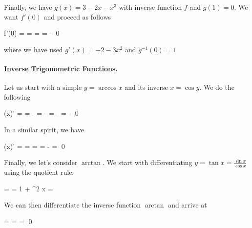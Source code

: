Finally, we have $g(x) = 3-2x-x^3$ with inverse function $f$ and $g(1) = 0$. We want $f'(0)$ and proceed as follows

\bee
f'(0) =  =  =  = -  \qed
\eee

where we have used $g'(x) = -2 - 3x^2$ and $g^{-1}(0) = 1$

\paragraph{Inverse Trigonometric Functions.} Let us start with a simple $y = \arccos x$ and its inverse $x = \cos y$. We do the following

\bee
(\arccos x)' =  = -  = -  = -  = -  \qed
\eee

In a similar spirit, we have

\bee
(\arcsin x)' =  =  =  = -  =  \qed
\eee

Finally, we let's consider $\arctan$. We start with differentiating $y = \tan x = \frac{\sin x}{\cos x}$ using the quotient rule:

\bee
{} =  = 1 + \tan^2 x = 
\eee

We can then differentiate the inverse function $\arctan$ and arrive at

\bee
{} =  =  =  \qed
\eee